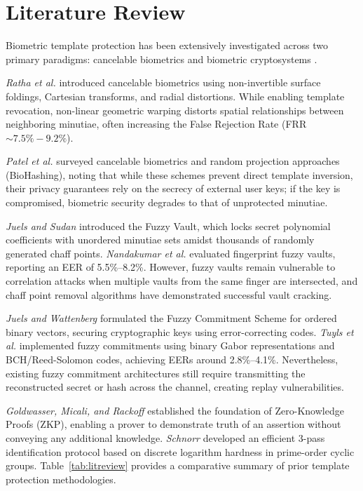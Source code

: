 \documentclass[conference]{IEEEtran}
\begin{document}
\section{Literature Review}
Biometric template protection has been extensively investigated across two primary paradigms: cancelable biometrics and biometric cryptosystems \cite{patel2015cancelable}.

\textit{Ratha et al.} \cite{ratha2007cancelable} introduced cancelable biometrics using non-invertible surface foldings, Cartesian transforms, and radial distortions. While enabling template revocation, non-linear geometric warping distorts spatial relationships between neighboring minutiae, often increasing the False Rejection Rate (FRR $\sim 7.5\% - 9.2\%$).

\textit{Patel et al.} \cite{patel2015cancelable} surveyed cancelable biometrics and random projection approaches (BioHashing), noting that while these schemes prevent direct template inversion, their privacy guarantees rely on the secrecy of external user keys; if the key is compromised, biometric security degrades to that of unprotected minutiae.

\textit{Juels and Sudan} \cite{juels2006fuzzyvault} introduced the Fuzzy Vault, which locks secret polynomial coefficients with unordered minutiae sets amidst thousands of randomly generated chaff points. \textit{Nandakumar et al.} \cite{nandakumar2007vault} evaluated fingerprint fuzzy vaults, reporting an EER of 5.5\%--8.2\%. However, fuzzy vaults remain vulnerable to correlation attacks when multiple vaults from the same finger are intersected, and chaff point removal algorithms have demonstrated successful vault cracking.

\textit{Juels and Wattenberg} \cite{juels1999fuzzy} formulated the Fuzzy Commitment Scheme for ordered binary vectors, securing cryptographic keys using error-correcting codes. \textit{Tuyls et al.} \cite{tuyls2005practical} implemented fuzzy commitments using binary Gabor representations and BCH/Reed-Solomon codes, achieving EERs around 2.8\%--4.1\%. Nevertheless, existing fuzzy commitment architectures still require transmitting the reconstructed secret or hash across the channel, creating replay vulnerabilities.

\textit{Goldwasser, Micali, and Rackoff} \cite{goldwasser1989knowledge} established the foundation of Zero-Knowledge Proofs (ZKP), enabling a prover to demonstrate truth of an assertion without conveying any additional knowledge. \textit{Schnorr} \cite{schnorr1991efficient} developed an efficient 3-pass identification protocol based on discrete logarithm hardness in prime-order cyclic groups. Table~\ref{tab:litreview} provides a comparative summary of prior template protection methodologies.
\end{document}
